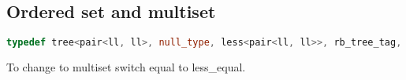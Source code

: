 \subsection{Ordered set and multiset}

\begin{lstlisting}[language=C++]
typedef tree<pair<ll, ll>, null_type, less<pair<ll, ll>>, rb_tree_tag, tree_order_statistics_node_update> ordered_set;
\end{lstlisting}

To change to multiset switch equal to less\_equal.